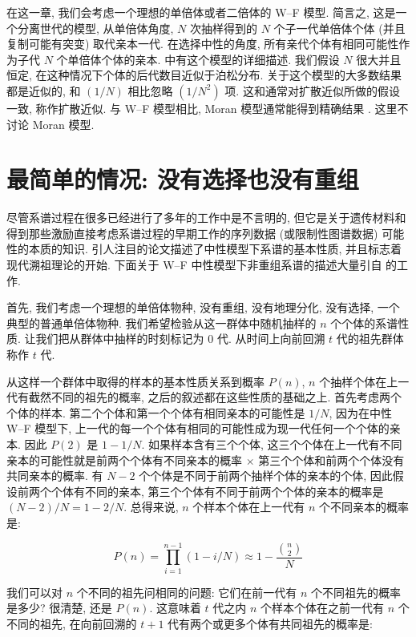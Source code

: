 \documentclass[12pt]{article}
\begin{document}
在这一章, 我们会考虑一个理想的单倍体或者二倍体的 W--F 模型.
简言之, 这是一个分离世代的模型, 从单倍体角度, $N$ 次抽样得到的 $N$ 个子一代单倍体个体 (并且复制可能有突变) 取代亲本一代.
在选择中性的角度, 所有亲代个体有相同可能性作为子代 $N$ 个单倍体个体的亲本.
\textcite{ewens2012mathematical} 中有这个模型的详细描述.
我们假设 $N$ 很大并且恒定, 在这种情况下个体的后代数目近似于泊松分布.
关于这个模型的大多数结果都是近似的, 和 $(1/N)$ 相比忽略 $(1/N^{2})$ 项.
这和通常对扩散近似所做的假设一致, 称作扩散近似.
与 W--F 模型相比, Moran 模型通常能得到精确结果 \parencite{watterson1975}.
这里不讨论 Moran 模型.

\section{最简单的情况: 没有选择也没有重组}

尽管系谱过程在很多已经进行了多年的工作中是不言明的,
但它是关于遗传材料和得到那些激励直接考虑系谱过程的早期工作的序列数据 (或限制性图谱数据) 可能性的本质的知识.
\textcite{watterson1975} 引人注目的论文描述了中性模型下系谱的基本性质, 并且标志着现代溯祖理论的开始.
下面关于 W--F 中性模型下非重组系谱的描述大量引自 \textcite{watterson1975, griffiths1980, tajima1983} 的工作.

首先, 我们考虑一个理想的单倍体物种, 没有重组, 没有地理分化, 没有选择, 一个典型的普通单倍体物种.
我们希望检验从这一群体中随机抽样的 $n$ 个个体的系谱性质. 让我们把从群体中抽样的时刻标记为 0 代.
从时间上向前回溯 $t$ 代的祖先群体称作 $t$ 代.

从这样一个群体中取得的样本的基本性质关系到概率 $P(n)$, $n$ 个抽样个体在上一代有截然不同的祖先的概率,
之后的叙述都在这些性质的基础之上.
首先考虑两个个体的样本. 第二个个体和第一个个体有相同亲本的可能性是 $1/N$,
因为在中性 W--F 模型下, 上一代的每一个个体有相同的可能性成为现一代任何一个个体的亲本.
因此 $P(2)$ 是 $1-1/N$.
如果样本含有三个个体, 这三个个体在上一代有不同亲本的可能性就是前两个个体有不同亲本的概率
$\times$ 第三个个体和前两个个体没有共同亲本的概率.
有 $N-2$ 个个体是不同于前两个抽样个体的亲本的个体, 因此假设前两个个体有不同的亲本,
第三个个体有不同于前两个个体的亲本的概率是 $(N-2)/N=1-2/N$.
总得来说, $n$ 个样本个体在上一代有 $n$ 个不同亲本的概率是:

\begin{equation} \label{eq:3}
    P(n) = \prod_{i=1}^{n-1}(1-i/N) \approx 1-\frac{\binom{n}{2}}{N}
\end{equation}

我们可以对 $n$ 个不同的祖先问相同的问题: 它们在前一代有 $n$ 个不同祖先的概率是多少?
很清楚, 还是 $P(n)$. 这意味着 $t$ 代之内 $n$ 个样本个体在之前一代有 $n$ 个不同的祖先,
在向前回溯的 $t+1$ 代有两个或更多个体有共同祖先的概率是:
\end{document}
